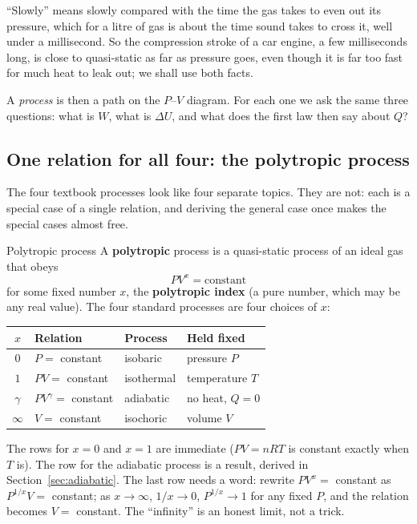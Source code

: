 ``Slowly'' means slowly compared with the time the gas takes to even out its pressure, which for a
litre of gas is about the time sound takes to cross it, well under a millisecond. So the compression
stroke of a car engine, a few milliseconds long, is close to quasi-static as far as pressure goes, even
though it is far too fast for much heat to leak out; we shall use both facts.

A \emph{process} is then a path on the $P$--$V$ diagram. For each one we ask the same three questions:
what is $W$, what is $\Delta U$, and what does the first law then say about $Q$?

\subsection{One relation for all four: the polytropic process}\label{sec:polytropic}

The four textbook processes look like four separate topics. They are not: each is a special case of a
single relation, and deriving the general case once makes the special cases almost free.

\begin{defbox}{Polytropic process}
A \textbf{polytropic} process is a quasi-static process of an ideal gas that obeys
\[
\boxed{\;PV^{x}=\text{constant}\;}
\]
for some fixed number $x$, the \textbf{polytropic index} (a pure number, which may be any real value).
The four standard processes are four choices of $x$:
\begin{center}
\begin{tabular}{@{}clll@{}}
\toprule
$x$ & Relation & Process & Held fixed\\
\midrule
$0$ & $P=$ constant & isobaric & pressure $P$\\
$1$ & $PV=$ constant & isothermal & temperature $T$\\
$\gamma$ & $PV^\gamma=$ constant & adiabatic & no heat, $Q=0$\\
$\infty$ & $V=$ constant & isochoric & volume $V$\\
\bottomrule
\end{tabular}
\end{center}
\end{defbox}

The rows for $x=0$ and $x=1$ are immediate ($PV=nRT$ is constant exactly when $T$ is). The row for the
adiabatic process is a result, derived in Section~\ref{sec:adiabatic}. The last row needs a word: rewrite
$PV^x=$ constant as $P^{1/x}V=$ constant; as $x\to\infty$, $1/x\to0$, $P^{1/x}\to1$ for any fixed $P$, and
the relation becomes $V=$ constant. The ``infinity'' is an honest limit, not a trick.

